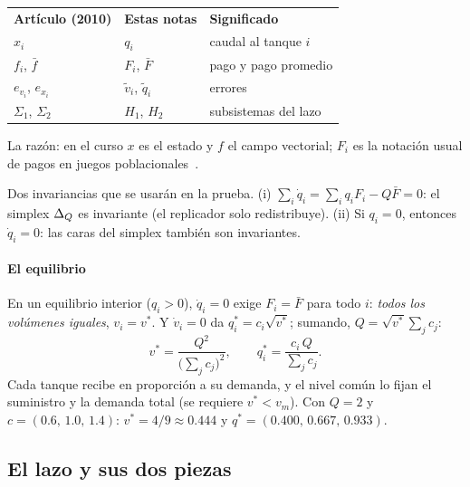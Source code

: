 \begin{cuidado}
\begin{tabular}{@{}lll@{}}
\textbf{Artículo (2010)} & \textbf{Estas notas} & \textbf{Significado}\\
$x_i$ & $q_i$ & caudal al tanque $i$\\
$f_i$, $\bar f$ & $F_i$, $\bar F$ & pago y pago promedio\\
$e_{v_i}$, $e_{x_i}$ & $\tilde v_i$, $\tilde q_i$ & errores\\
$\Sigma_1$, $\Sigma_2$ & $H_1$, $H_2$ & subsistemas del lazo
\end{tabular}

\smallskip
La razón: en el curso $x$ es el estado y $f$ el campo vectorial; $F_i$ es la notación usual de pagos en juegos poblacionales~\citep{San10}.
\end{cuidado}

\begin{ideaclave}
Dos invariancias que se usarán en la prueba. (i) $\sum_i\dot q_i=\sum_iq_iF_i-Q\bar F=0$: el simplex $\Delta_Q$ es invariante (el replicador solo redistribuye). (ii) Si $q_i=0$, entonces $\dot q_i=0$: las caras del simplex también son invariantes.
\end{ideaclave}

\paragraph{El equilibrio}
En un equilibrio interior ($q_i>0$), $\dot q_i=0$ exige $F_i=\bar F$ para todo $i$: \emph{todos los volúmenes iguales}, $v_i=v^*$. Y $\dot v_i=0$ da $q_i^*=c_i\sqrt{v^*}$; sumando, $Q=\sqrt{v^*}\sum_jc_j$:
\begin{equation}
  v^*=\frac{Q^2}{\bigl(\sum_jc_j\bigr)^2},\qquad q_i^*=\frac{c_i\,Q}{\sum_jc_j} .
  \label{eq:pa-equilibrioagua}
\end{equation}
Cada tanque recibe en proporción a su demanda, y el nivel común lo fijan el suministro y la demanda total (se requiere $v^*<v_m$). Con $Q=2$ y $c=(0.6,\,1.0,\,1.4)$: $v^*=4/9\approx0.444$ y $q^*=(0.400,\,0.667,\,0.933)$.

\subsection{El lazo y sus dos piezas}

